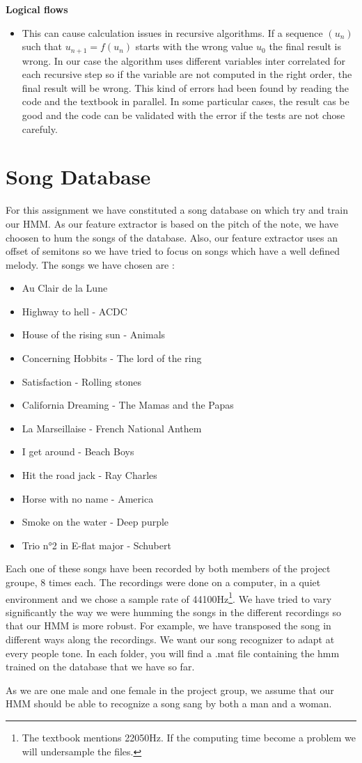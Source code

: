 \documentclass[a4paper]{report}
\newenvironment{pushright}[1]{\textbf{#1}
\begin{itemize}\item[\hspace{12pt}]}{\end{itemize}
}
\begin{document}
\begin{pushright}{Logical flows}
  This can cause calculation issues in recursive algorithms. If a sequence $(u_n)$ such that $ u_{n+1}=f(u_n)$ starts with the wrong value $u_0$ the final result is wrong. In our case the algorithm uses different variables inter correlated for each recursive step so if the variable are not computed in the right order, the final result will be wrong. This kind of errors had been found by reading the code and the textbook in parallel. In some particular cases, the result cas be good and the code can be validated with the error if the tests are not chose carefuly.
\end{pushright}

\pagebreak

\section{Song Database}

For this assignment we have constituted a song database on which try and train our HMM.
As our feature extractor is based on the pitch of the note, we have choosen to hum the songs of the database. Also, our feature extractor uses an offset of semitons so we have tried to focus on songs which have a well defined melody. The songs we have chosen are :

\begin {itemize}
\item Au Clair de la Lune
\item Highway to hell - ACDC
\item House of the rising sun - Animals
\item Concerning Hobbits - The lord of the ring
\item Satisfaction - Rolling stones
\item California Dreaming - The Mamas and the Papas
\item La Marseillaise - French National Anthem
\item I get around - Beach Boys
\item Hit the road jack - Ray Charles
\item Horse with no name - America
\item Smoke on the water - Deep purple
\item Trio n°2 in E-flat major - Schubert
\end{itemize}

Each one of these songs have been recorded by both members of the project groupe, 8 times each. The recordings were done on a computer, in a quiet environment and we chose a sample rate of 44100Hz\footnote{The textbook mentions 22050Hz. If the computing time become a problem we will undersample the files.}. We have tried to vary significantly the way we were humming the songs in the different recordings so that our HMM is more robust. For example, we have transposed the song in different ways along the recordings. We want our song recognizer to adapt at every people tone. In each folder, you will find a .mat file containing the hmm trained on the database that we have so far.

As we are one male and one female in the project group, we assume that our HMM should be able to recognize a song sang by both a man and a woman.
\end{document}

